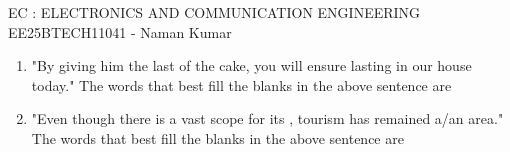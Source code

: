 \documentclass[a4paper, 11pt]{article}
\begin{document}
\begin{center}
    \huge{EC : ELECTRONICS AND COMMUNICATION ENGINEERING}\\
    \large{EE25BTECH11041 - Naman Kumar}
\end{center}
\begin{enumerate}
\section*{General Aptitude (GA)}
    \item "By giving him the last \underline{\hspace{2cm}} of the cake, you will ensure lasting \underline{\hspace{2cm}} in our house today."
    The words that best fill the blanks in the above sentence are
    \begin{enumerate}
    \end{enumerate}

    \hfill{}

    \item "Even though there is a vast scope for its \underline{\hspace{2cm}}, tourism has remained a/an \underline{\hspace{2cm}} area."
    The words that best fill the blanks in the above sentence are
    \begin{enumerate}
    \end{enumerate}

    \hfill{}


\end{enumerate}
\end{document}

